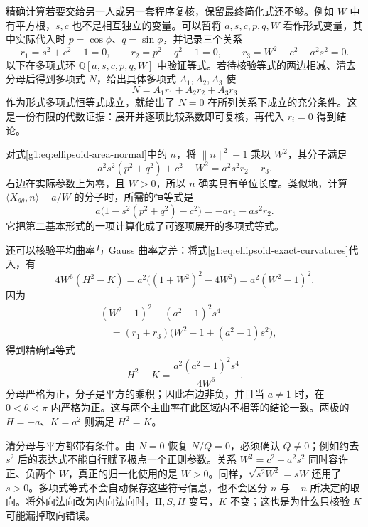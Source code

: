 \ProseParagraphBreak

精确计算若要交给另一人或另一套程序复核，保留最终简化式还不够。例如 \(W\) 中有平方根，\(s,c\) 也不是相互独立的变量。可以暂将 \(a,s,c,p,q,W\) 看作形式变量，其中实际代入时 \(p=\cos\phi\)、\(q=\sin\phi\)，并记录三个关系
\[
	r_1=s^2+c^2-1=0,\qquad r_2=p^2+q^2-1=0,
	\qquad r_3=W^2-c^2-a^2s^2=0.
\]
以下在多项式环 \(\mathbb Q[a,s,c,p,q,W]\) 中验证等式。若待核验等式的两边相减、清去分母后得到多项式 \(N\)，给出具体多项式 \(A_1,A_2,A_3\) 使
\begin{equation}\label{g1:eq:polynomial-identity-certificate}
	N=A_1r_1+A_2r_2+A_3r_3
\end{equation}
作为形式多项式恒等式成立，就给出了 \(N=0\) 在所列关系下成立的充分条件。这是一份有限的代数证据：展开并逐项比较系数即可复核，再代入 \(r_i=0\) 得到结论。

\begin{example}\label{g1:exm:ellipsoid-polynomial-witnesses}
	对式\eqref{g1:eq:ellipsoid-area-normal}中的 \(n\)，将 \(\lVert n\rVert^2-1\) 乘以 \(W^2\)，其分子满足
	\[
		a^2s^2(p^2+q^2)+c^2-W^2=a^2s^2r_2-r_3.
	\]
	右边在实际参数上为零，且 \(W>0\)，所以 \(n\) 确实具有单位长度。类似地，计算 \(\langle X_{\theta\theta},n\rangle+a/W\) 的分子时，所需的恒等式是
	\[
		a\bigl(1-s^2(p^2+q^2)-c^2\bigr)=-ar_1-as^2r_2.
	\]
	它把第二基本形式的一项计算化成了可逐项展开的多项式等式。

	还可以核验平均曲率与 Gauss 曲率之差：将式\eqref{g1:eq:ellipsoid-exact-curvatures}代入，有
	\[
		4W^6(H^2-K)=a^2\bigl((1+W^2)^2-4W^2\bigr)=a^2(W^2-1)^2.
	\]
	因为
	\[
		\begin{aligned}
			&(W^2-1)^2-(a^2-1)^2s^4\\
			&\quad=(r_1+r_3)\bigl(W^2-1+(a^2-1)s^2\bigr),
		\end{aligned}
	\]
	得到精确恒等式
	\begin{equation}\label{g1:eq:ellipsoid-umbilic-witness}
		H^2-K=\frac{a^2(a^2-1)^2s^4}{4W^6}.
	\end{equation}
	分母严格为正，分子是平方的乘积；因此右边非负，并且当 \(a\ne1\) 时，在 \(0<\theta<\pi\) 内严格为正。这与两个主曲率在此区域内不相等的结论一致。两极的 \(H=-a\)、\(K=a^2\) 则满足 \(H^2=K\)。
\end{example}

清分母与平方都带有条件。由 \(N=0\) 恢复 \(N/Q=0\)，必须确认 \(Q\ne0\)；例如约去 \(s^2\) 后的表达式不能自行赋予极点一个正则参数。关系 \(W^2=c^2+a^2s^2\) 同时容许正、负两个 \(W\)，真正的归一化使用的是 \(W>0\)。同样，\(\sqrt{s^2W^2}=sW\) 还用了 \(s>0\)。多项式等式不会自动保存这些符号信息，也不会区分 \(n\) 与 \(-n\) 所决定的取向。将外向法向改为内向法向时，\(\mathrm{II},S,H\) 变号，\(K\) 不变；这也是为什么只核验 \(K\) 可能漏掉取向错误。

